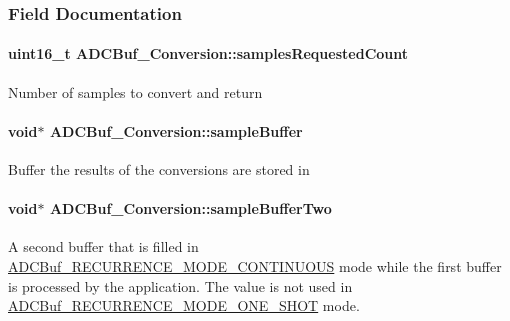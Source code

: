 \subsubsection{Field Documentation}
\paragraph[{samples\+Requested\+Count}]{\setlength{\rightskip}{0pt plus 5cm}uint16\+\_\+t A\+D\+C\+Buf\+\_\+\+Conversion\+::samples\+Requested\+Count}\label{struct_a_d_c_buf___conversion_afd95c203d1e7dd347102eef22dc9cc93}
Number of samples to convert and return 
\paragraph[{sample\+Buffer}]{\setlength{\rightskip}{0pt plus 5cm}void$\ast$ A\+D\+C\+Buf\+\_\+\+Conversion\+::sample\+Buffer}\label{struct_a_d_c_buf___conversion_a5415e58a69e40124f66cdcc52a097c4a}
Buffer the results of the conversions are stored in 
\paragraph[{sample\+Buffer\+Two}]{\setlength{\rightskip}{0pt plus 5cm}void$\ast$ A\+D\+C\+Buf\+\_\+\+Conversion\+::sample\+Buffer\+Two}\label{struct_a_d_c_buf___conversion_a6953e200ba2e5a85b9197bdaeb101a5f}
A second buffer that is filled in \hyperlink{_a_d_c_buf_8h_af15cc4961b02af48216132c2b8bc88f1ac10945188f88ddadd4322c4e117d5b3c}{A\+D\+C\+Buf\+\_\+\+R\+E\+C\+U\+R\+R\+E\+N\+C\+E\+\_\+\+M\+O\+D\+E\+\_\+\+C\+O\+N\+T\+I\+N\+U\+O\+U\+S} mode while the first buffer is processed by the application. The value is not used in \hyperlink{_a_d_c_buf_8h_af15cc4961b02af48216132c2b8bc88f1a1916212b661aa853b7a581e3e5dc35e2}{A\+D\+C\+Buf\+\_\+\+R\+E\+C\+U\+R\+R\+E\+N\+C\+E\+\_\+\+M\+O\+D\+E\+\_\+\+O\+N\+E\+\_\+\+S\+H\+O\+T} mode. 
